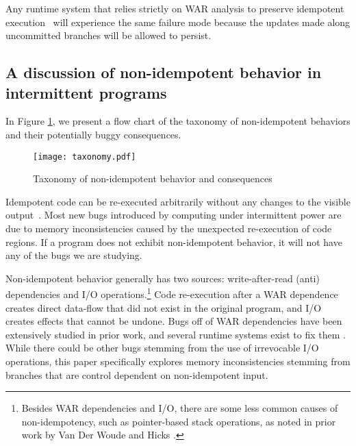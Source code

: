 Any runtime system that relies strictly on WAR analysis to preserve idempotent
execution~\cite{dino, alpaca, ratchet} will experience the same failure mode
because the updates made along uncommitted branches will be allowed to persist.


\subsection{A discussion of non-idempotent behavior in intermittent programs}

In Figure \ref{fig:tax}, we present a flow chart of the taxonomy of
non-idempotent behaviors and their potentially buggy consequences.

\begin{figure}[ht]
\centering
\texttt{[image: taxonomy.pdf]}
\caption{Taxonomy of non-idempotent behavior and consequences}
\label{fig:tax}
\end{figure}
Idempotent code can be re-executed arbitrarily without any changes to the
visible output~\cite{ratchet,dino}. Most new bugs introduced by computing under
intermittent power are due to memory inconsistencies caused by the unexpected
re-execution of code regions. If a program does not exhibit non-idempotent
behavior, it will not have any of the bugs we are studying.

Non-idempotent behavior generally has two sources: write-after-read (anti)
dependencies and I/O operations.\footnote{Besides WAR dependencies and I/O,
there are some less common causes of non-idempotency, such as pointer-based
stack operations, as noted in prior work by Van Der Woude and Hicks
\cite{ratchet}.} Code re-execution after a WAR dependence creates direct
data-flow that did not exist in the original program, and I/O creates effects
that cannot be undone. Bugs off of WAR dependencies have been extensively
studied in prior work, and several runtime systems exist to fix them
\cite{ratchet, alpaca, dino}. While there could be other bugs
stemming from the use of irrevocable I/O operations, this paper specifically
explores memory inconsistencies stemming from branches that are control
dependent on non-idempotent input.


